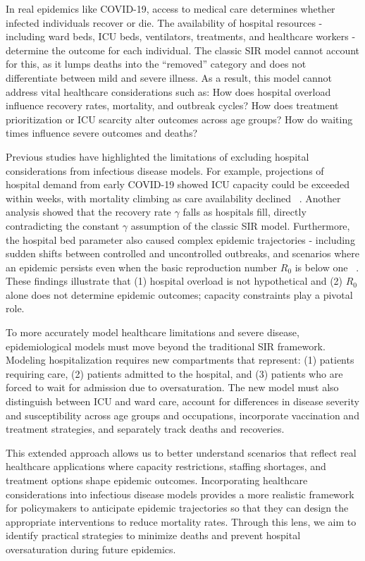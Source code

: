 \documentclass[10pt,twocolumn]{article}
\begin{document}
In real epidemics like COVID-19, access to medical care determines whether infected individuals recover or die. The availability of hospital resources - including ward beds, ICU beds, ventilators, treatments, and healthcare workers - determine the outcome for each individual. The classic SIR model cannot account for this, as it lumps deaths into the “removed” category and does not differentiate between mild and severe illness. As a result, this model cannot address vital healthcare considerations such as: How does hospital overload influence recovery rates, mortality, and outbreak cycles? How does treatment prioritization or ICU scarcity alter outcomes across age groups? How do waiting times influence severe outcomes and deaths?

Previous studies have highlighted the limitations of excluding hospital considerations from infectious disease models. For example, projections of hospital demand from early COVID-19 showed ICU capacity could be exceeded within weeks, with mortality climbing as care availability declined ~\cite{weissman2020}.  Another analysis showed that the recovery rate $\gamma$ falls as hospitals fill, directly contradicting the constant $\gamma$ assumption of the classic SIR model. Furthermore, the hospital bed parameter also caused complex epidemic trajectories - including sudden shifts between controlled and uncontrolled outbreaks, and scenarios where an epidemic persists even when the basic reproduction number $R_0$ is below one ~\cite{shan2014}. These findings illustrate that (1) hospital overload is not hypothetical and (2) $R_0$ alone does not determine epidemic outcomes; capacity constraints play a pivotal role. 

To more accurately model healthcare limitations and severe disease, epidemiological models must move beyond the traditional SIR framework. Modeling hospitalization requires new compartments that represent: (1) patients requiring care, (2) patients admitted to the hospital, and (3) patients who are forced to wait for admission due to oversaturation. The new model must also distinguish between ICU and ward care, account for differences in disease severity and susceptibility across age groups and occupations, incorporate vaccination and treatment strategies, and separately track deaths and recoveries. 

This extended approach allows us to better understand scenarios that reflect real healthcare applications where capacity restrictions, staffing shortages, and treatment options shape epidemic outcomes. Incorporating healthcare considerations into infectious disease models provides a more realistic framework for policymakers to anticipate epidemic trajectories so that they can design the appropriate interventions to reduce mortality rates. Through this lens, we aim to identify practical strategies to minimize deaths and prevent hospital oversaturation during future epidemics.  
\end{document}
